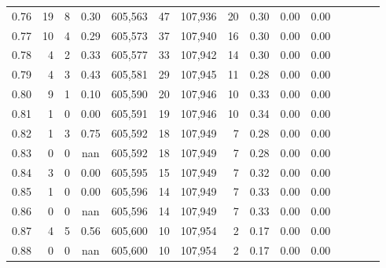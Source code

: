 \begin{tabular}{rrrcrrrrrrrrrrr}
0.76 &      19 &      8 &                                       0.30 &  605,563 &       47 &  107,936 &       20 &  0.30 &  0.00 &                         0.00 \\
0.77 &      10 &      4 &                                       0.29 &  605,573 &       37 &  107,940 &       16 &  0.30 &  0.00 &                         0.00 \\
0.78 &       4 &      2 &                                       0.33 &  605,577 &       33 &  107,942 &       14 &  0.30 &  0.00 &                         0.00 \\
0.79 &       4 &      3 &                                       0.43 &  605,581 &       29 &  107,945 &       11 &  0.28 &  0.00 &                         0.00 \\
0.80 &       9 &      1 &                                       0.10 &  605,590 &       20 &  107,946 &       10 &  0.33 &  0.00 &                         0.00 \\
0.81 &       1 &      0 &                                       0.00 &  605,591 &       19 &  107,946 &       10 &  0.34 &  0.00 &                         0.00 \\
0.82 &       1 &      3 &                                       0.75 &  605,592 &       18 &  107,949 &        7 &  0.28 &  0.00 &                         0.00 \\
0.83 &       0 &      0 &                                        nan &  605,592 &       18 &  107,949 &        7 &  0.28 &  0.00 &                         0.00 \\
0.84 &       3 &      0 &                                       0.00 &  605,595 &       15 &  107,949 &        7 &  0.32 &  0.00 &                         0.00 \\
0.85 &       1 &      0 &                                       0.00 &  605,596 &       14 &  107,949 &        7 &  0.33 &  0.00 &                         0.00 \\
0.86 &       0 &      0 &                                        nan &  605,596 &       14 &  107,949 &        7 &  0.33 &  0.00 &                         0.00 \\
0.87 &       4 &      5 &                                       0.56 &  605,600 &       10 &  107,954 &        2 &  0.17 &  0.00 &                         0.00 \\
0.88 &       0 &      0 &                                        nan &  605,600 &       10 &  107,954 &        2 &  0.17 &  0.00 &                         0.00 \\

\end{tabular}
